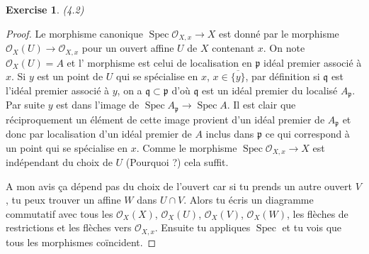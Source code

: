 \documentclass[A4, 11pt]{article}
\newtheorem{exer}{Exercise}
\def\Spec{ \operatorname{Spec}}
\begin{document}
\begin{exer} (4.2)
\end{exer}
\begin{proof}
Le morphisme canonique $\Spec \mathcal{O}_{X,x} \rightarrow X$ est donné par le morphisme 
$\mathcal{O}_{X}(U) \rightarrow \mathcal{O}_{X,x}$ pour un ouvert affine $U$ de $X$ contenant $x$. On note $\mathcal{O}_{X}(U)=A$ et l' morphisme est celui de localisation en $\mathfrak{p}$ idéal premier associé à $x$. Si $y$ est un point de $U$ qui se spécialise en $x$, $x\in \overline{\{y\}}$, par définition si $\mathfrak{q}$ est l'idéal premier associé à $y$, on a $\mathfrak{q} \subset \mathfrak{p}$ d'où $\mathfrak{q}$ est un idéal premier du localisé $A_{\mathfrak{p}}$. Par suite $y$ est dans l'image de $\Spec A_{\mathfrak{p}} \rightarrow \Spec A$. Il est clair que réciproquement un élément de cette image provient d'un idéal premier de $A_{\mathfrak{p}}$ et donc par localisation d'un idéal premier de $A$ inclus dans $\mathfrak{p}$ ce qui correspond à un point qui se spécialise en $x$. Comme le morphisme $\Spec \mathcal{O}_{X,x} \rightarrow X$ est indépendant du choix de $U$ (Pourquoi ?) cela suffit.

{\color{blue} A mon avis ça dépend pas du choix de l'ouvert car si tu prends un autre ouvert $V$, tu peux trouver un affine $W$ dans $U\cap V$. Alors tu écris un diagramme commutatif avec tous les $\mathcal{O}_X(X)$, $\mathcal{O}_X(U)$, $\mathcal{O}_X(V)$, $\mathcal{O}_X(W)$, les flèches de restrictions et les flèches vers $\mathcal{O}_{X,x}$. Ensuite tu appliques $\Spec$ et tu vois que tous les morphismes coïncident.}

\end{proof}
\end{document}
